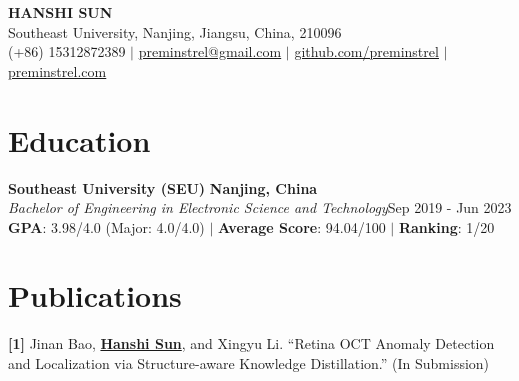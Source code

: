 \documentclass[letterpaper,11pt]{article}
\begin{document}
\begin{center}
    {\textbf{\huge HANSHI SUN}} \\ \vspace{8pt}
    \small Southeast University, Nanjing, Jiangsu, China, 210096\\\vspace{3pt}
    \small (+86) 15312872389 $|$
    \href{mailto:preminstrel@gmail.com}{preminstrel@gmail.com} $|$
    \href{https://github.com/preminstrel}{\textcolor{link}{\underline{github.com/preminstrel}}} $|$
    \href{https://preminstrel.com}{\textcolor{link}{\underline{preminstrel.com}}}
\end{center}

\section{\textbf{Education}}
{\bf Southeast University (SEU)} \hfill{\textbf{Nanjing, China}}\\
\textit{Bachelor of Engineering in Electronic Science and Technology}\hfill{Sep 2019 - Jun 2023}\\
\textbf{GPA}: 3.98/4.0 (Major: 4.0/4.0) $|$ \textbf{Average Score}: 94.04/100 $|$ \textbf{Ranking}: 1/20\\

\vspace{-9pt}

\section{\textbf{Publications}}
\textbf{[1]} Jinan Bao, \underline{\textbf{Hanshi Sun}}, and Xingyu Li. ``Retina OCT Anomaly Detection and Localization via Structure-aware Knowledge Distillation.'' (In Submission)\\
\vspace{3pt}
\end{document}
